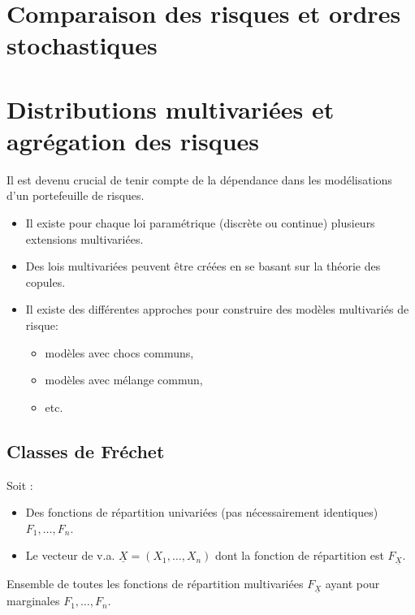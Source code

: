 \documentclass[10pt, french]{article}
\begin{document}
\begin{multicols*}{2}



\pagebreak
\section{Comparaison des risques et ordres stochastiques}


\pagebreak
\section{Distributions multivariées et agrégation des risques}
\begin{rappel_enhanced}[Contexte]
Il est devenu crucial de tenir compte de la dépendance dans les modélisations d'un portefeuille de risques.
\begin{itemize}
	\item	Il existe pour chaque loi paramétrique (discrète ou continue) plusieurs extensions multivariées.
	\item	Des lois multivariées peuvent être créées en se basant sur la théorie des copules.
	\item	Il existe des différentes approches pour construire des modèles multivariés de risque: 
		\begin{itemize}
		\item	modèles avec chocs communs,
		\item	modèles avec mélange commun,
		\item	etc.
		\end{itemize}
\end{itemize}
\end{rappel_enhanced}


\subsection{Classes de Fréchet}
Soit : 
\begin{itemize}
	\item	Des fonctions de répartition univariées (pas nécessairement identiques) $F_{1}, \dots, F_{n}$.
	\item	Le vecteur de v.a. $\underline{X}	=	(X_{1}, \dots, X_{n})$ dont la fonction de répartition est $F_{\underline{X}}$.
\end{itemize}
\begin{definitionNOHFILL}
Ensemble de toutes les fonctions de répartition multivariées $F_{\underline{X}}$ ayant pour marginales $F_{1}, \dots, F_{n}$.
\end{definitionNOHFILL}


\end{multicols*}
\end{document}

